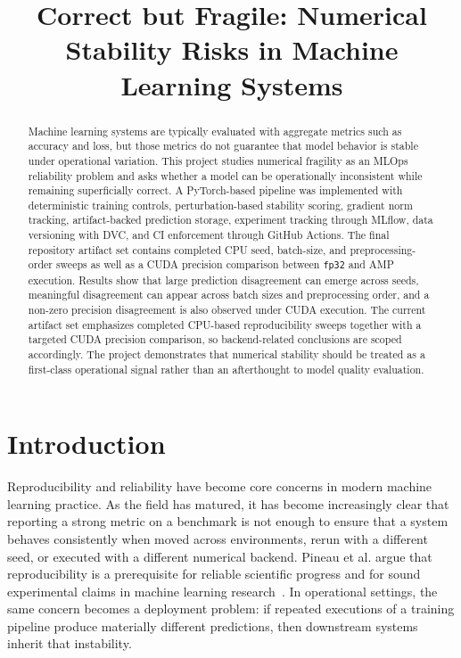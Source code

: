 \documentclass[conference]{IEEEtran}
\title{Correct but Fragile: Numerical Stability Risks in Machine Learning Systems}
\author{
\IEEEauthorblockN{Cordell Stonecipher}
\IEEEauthorblockA{
CSI 4150 -- AI for IT Operations\\
Oakland University\\
Rochester, Michigan, USA
}
}
\begin{document}
\maketitle

\begin{abstract}
Machine learning systems are typically evaluated with aggregate metrics such as accuracy and loss, but those metrics do not guarantee that model behavior is stable under operational variation. This project studies numerical fragility as an MLOps reliability problem and asks whether a model can be operationally inconsistent while remaining superficially correct. A PyTorch-based pipeline was implemented with deterministic training controls, perturbation-based stability scoring, gradient norm tracking, artifact-backed prediction storage, experiment tracking through MLflow, data versioning with DVC, and CI enforcement through GitHub Actions. The final repository artifact set contains completed CPU seed, batch-size, and preprocessing-order sweeps as well as a CUDA precision comparison between \texttt{fp32} and AMP execution. Results show that large prediction disagreement can emerge across seeds, meaningful disagreement can appear across batch sizes and preprocessing order, and a non-zero precision disagreement is also observed under CUDA execution. The current artifact set emphasizes completed CPU-based reproducibility sweeps together with a targeted CUDA precision comparison, so backend-related conclusions are scoped accordingly. The project demonstrates that numerical stability should be treated as a first-class operational signal rather than an afterthought to model quality evaluation.
\end{abstract}

\section{Introduction}

Reproducibility and reliability have become core concerns in modern machine learning practice. As the field has matured, it has become increasingly clear that reporting a strong metric on a benchmark is not enough to ensure that a system behaves consistently when moved across environments, rerun with a different seed, or executed with a different numerical backend. Pineau et al. argue that reproducibility is a prerequisite for reliable scientific progress and for sound experimental claims in machine learning research~\cite{pineau2021}. In operational settings, the same concern becomes a deployment problem: if repeated executions of a training pipeline produce materially different predictions, then downstream systems inherit that instability.
\end{document}
